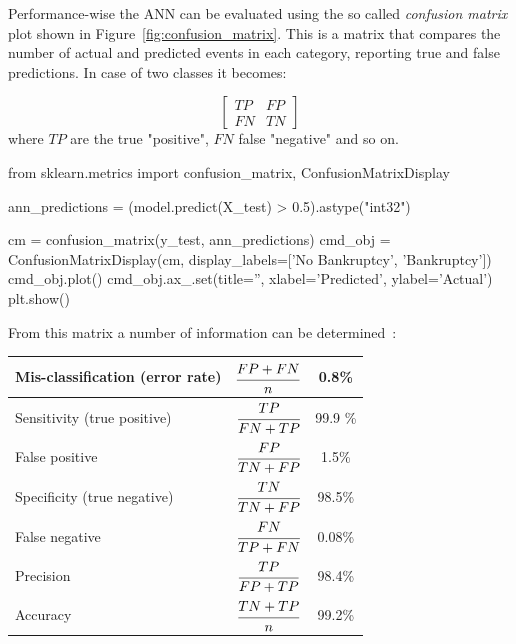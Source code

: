 Performance-wise the ANN can be evaluated using the so called \emph{confusion matrix} plot shown in Figure~\ref{fig:confusion_matrix}. This is a matrix that compares the number of actual and predicted events in each category, reporting true and false predictions. In case of two classes it becomes:

\begin{equation*}
	\begin{bmatrix}
		TP & FP \\
		FN & TN  
	\end{bmatrix}
\end{equation*}
\noindent
where $TP$ are the true "positive", $FN$ false "negative" and so on.

\begin{ipython}
from sklearn.metrics import confusion_matrix, ConfusionMatrixDisplay
	
ann_predictions = (model.predict(X_test) > 0.5).astype("int32")
	
cm = confusion_matrix(y_test, ann_predictions)
cmd_obj = ConfusionMatrixDisplay(cm, display_labels=['No Bankruptcy', 'Bankruptcy'])
cmd_obj.plot()
cmd_obj.ax_.set(title='', xlabel='Predicted', ylabel='Actual')
plt.show()
\end{ipython}
\noindent
From this matrix a number of information can be determined~\cite{bib:sensitivity}:

\makegapedcells\begin{table}[htbp]
\centering
\begin{tabular}{|l|c|c|}
\hline
Mis-classification (error rate) & $\cfrac{FP+FN}{n}$ & 0.8\% \\
\hline
Sensitivity (true positive) & $\cfrac{TP}{FN+TP}$ & 99.9 \% \\
\hline
False positive & $\cfrac{FP}{TN+FP}$ & 1.5\% \\
\hline
Specificity (true negative) & $\cfrac{TN}{TN+FP}$ &  98.5\% \\
\hline
False negative & $\cfrac{FN}{TP+FN}$ & 0.08\% \\
\hline
Precision & $\cfrac{TP}{FP+TP}$ & 98.4\% \\ 
\hline
Accuracy & $\cfrac{TN+TP}{n}$ & 99.2\% \\
\hline
\end{tabular}
\end{table}

